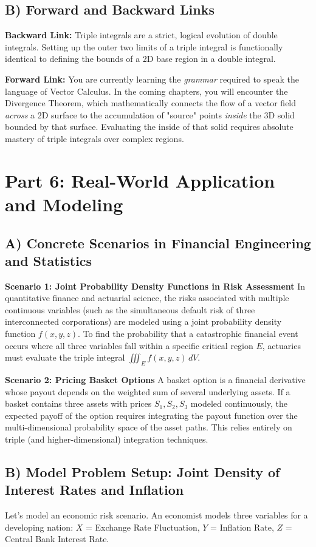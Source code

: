 \documentclass[12pt]{article}
\begin{document}
\subsection{B) Forward and Backward Links}
\textbf{Backward Link:} Triple integrals are a strict, logical evolution of double integrals. Setting up the outer two limits of a triple integral is functionally identical to defining the bounds of a 2D base region in a double integral.

\textbf{Forward Link:} You are currently learning the \textit{grammar} required to speak the language of Vector Calculus. In the coming chapters, you will encounter the Divergence Theorem, which mathematically connects the flow of a vector field \textit{across} a 2D surface to the accumulation of "source" points \textit{inside} the 3D solid bounded by that surface. Evaluating the inside of that solid requires absolute mastery of triple integrals over complex regions.

\newpage
\section{Part 6: Real-World Application and Modeling}

\subsection{A) Concrete Scenarios in Financial Engineering and Statistics}
\textbf{Scenario 1: Joint Probability Density Functions in Risk Assessment}
In quantitative finance and actuarial science, the risks associated with multiple continuous variables (such as the simultaneous default risk of three interconnected corporations) are modeled using a joint probability density function $f(x,y,z)$. To find the probability that a catastrophic financial event occurs where all three variables fall within a specific critical region $E$, actuaries must evaluate the triple integral $\iiint_E f(x,y,z) \, dV$.

\textbf{Scenario 2: Pricing Basket Options}
A basket option is a financial derivative whose payout depends on the weighted sum of several underlying assets. If a basket contains three assets with prices $S_1, S_2, S_3$ modeled continuously, the expected payoff of the option requires integrating the payout function over the multi-dimensional probability space of the asset paths. This relies entirely on triple (and higher-dimensional) integration techniques.

\subsection{B) Model Problem Setup: Joint Density of Interest Rates and Inflation}
Let's model an economic risk scenario. An economist models three variables for a developing nation: 
$X$ = Exchange Rate Fluctuation, 
$Y$ = Inflation Rate, 
$Z$ = Central Bank Interest Rate. 
\end{document}
